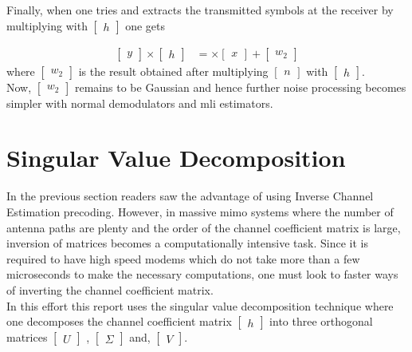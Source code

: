 Finally, when one tries and extracts the transmitted symbols at the receiver by multiplying with $\begin{bmatrix} h \end{bmatrix}$ one gets

\begin{align*}
\begin{bmatrix} y \end{bmatrix} \times
\begin{bmatrix} h \end{bmatrix} &=
\times
\begin{bmatrix} x \end{bmatrix}
+
\begin{bmatrix} w_2 \end{bmatrix}
\end{align*}
where $\begin{bmatrix} w_2 \end{bmatrix}$ is the result obtained after multiplying $\begin{bmatrix} n \end{bmatrix}$ with $\begin{bmatrix} h \end{bmatrix}$.\\

Now, $\begin{bmatrix} w_2 \end{bmatrix}$ remains to be Gaussian and hence further noise processing becomes simpler with normal demodulators and \acrshort{mli} estimators.




\section{Singular Value Decomposition}
In the previous section readers saw the advantage of using Inverse Channel Estimation precoding. However, in massive \acrshort{mimo} systems where the number of antenna paths are plenty and the order of the channel coefficient matrix is large, inversion of matrices becomes a computationally intensive task. Since it is required to have high speed \gls{modems} which do not take more than a few microseconds to make the necessary computations, one must look to faster ways of inverting the channel coefficient matrix.\\
In this effort this report uses the singular value decomposition technique where one decomposes the channel coefficient matrix $\begin{bmatrix} h \end{bmatrix}$ into three orthogonal matrices $\begin{bmatrix} U \end{bmatrix}$ , $\begin{bmatrix} \Sigma \end{bmatrix}$ and, $\begin{bmatrix} V \end{bmatrix}$.

